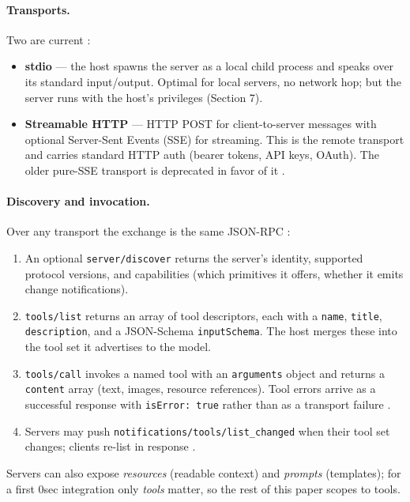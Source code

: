 \documentclass[11pt]{article}
\begin{document}
\paragraph{Transports.} Two are current \cite{mcp-arch}:
\begin{itemize}[leftmargin=*]
  \item \textbf{stdio} --- the host spawns the server as a local child process
  and speaks over its standard input/output. Optimal for local servers, no
  network hop; but the server runs with the host's privileges (Section 7).
  \item \textbf{Streamable HTTP} --- HTTP POST for client-to-server messages
  with optional Server-Sent Events (SSE) for streaming. This is the remote
  transport and carries standard HTTP auth (bearer tokens, API keys, OAuth).
  The older pure-SSE transport is deprecated in favor of it
  \cite{claudecode-mcp}.
\end{itemize}

\paragraph{Discovery and invocation.} Over any transport the exchange is the
same JSON-RPC \cite{mcp-arch}:
\begin{enumerate}[leftmargin=*]
  \item An optional \texttt{server/discover} returns the server's identity,
  supported protocol versions, and capabilities (which primitives it offers,
  whether it emits change notifications).
  \item \texttt{tools/list} returns an array of tool descriptors, each with a
  \texttt{name}, \texttt{title}, \texttt{description}, and a JSON-Schema
  \texttt{inputSchema}. The host merges these into the tool set it advertises to
  the model.
  \item \texttt{tools/call} invokes a named tool with an \texttt{arguments}
  object and returns a \texttt{content} array (text, images, resource
  references). Tool errors arrive as a successful response with
  \texttt{isError: true} rather than as a transport failure
  \cite{mcp-clientbp}.
  \item Servers may push \texttt{notifications/tools/list\_changed} when their
  tool set changes; clients re-list in response \cite{mcp-arch}.
\end{enumerate}

Servers can also expose \emph{resources} (readable context) and \emph{prompts}
(templates); for a first 0sec integration only \emph{tools} matter, so the rest
of this paper scopes to tools.
\end{document}
